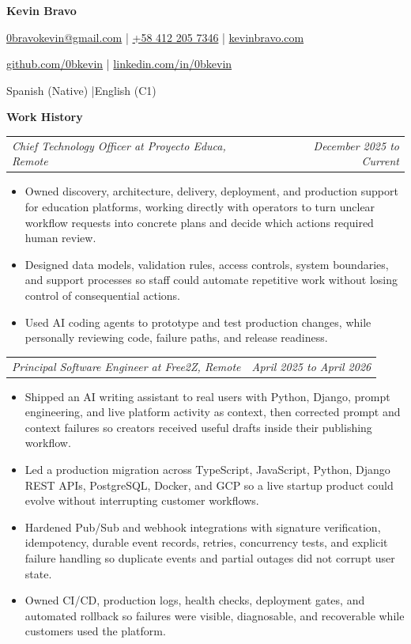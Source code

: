 \documentclass[10pt,letterpaper]{article}
\makeatletter
\newcommand{\bodyfont}{\fontsize{10.5}{15.75}\selectfont}
\newcommand{\contactfont}{\fontsize{12}{15}\selectfont}
\newcommand{\sectiontitle}[1]{%
  \vspace{4pt}
  {\bodyfont\textbf{#1}}\par
  \nopagebreak[4]
  \vspace{2pt}
}
\newcommand{\roleline}[2]{%
  \begin{tabularx}{\textwidth}{@{}Xr@{}}
    \bodyfont\textit{#1} & \bodyfont\textit{#2}
  \end{tabularx}
  \nopagebreak[4]
  \vspace{1pt}
}
\makeatother
\begin{document}
\bodyfont
\raggedright

\begin{center}
  {\fontsize{14}{17}\selectfont\textbf{Kevin Bravo}}\par
  \vspace{3pt}
  {\contactfont
    \href{mailto:0bravokevin@gmail.com}{0bravokevin@gmail.com}
    \enspace|\enspace
    \href{tel:+584122057346}{+58 412 205 7346}
    \enspace|\enspace
    \href{https://kevinbravo.com}{kevinbravo.com}
  }\par
  {\contactfont
    \href{https://github.com/0bkevin}{github.com/0bkevin}
    \enspace|\enspace
    \href{https://www.linkedin.com/in/0bkevin/}{linkedin.com/in/0bkevin}
  }\par
  {\contactfont Spanish (Native) \enspace|\enspace English (C1)}
\end{center}

\sectiontitle{Work History}

\roleline{Chief Technology Officer at Proyecto Educa, Remote}{December 2025 to Current}
\begin{itemize}
  \item Owned discovery, architecture, delivery, deployment, and production support for education platforms, working directly with operators to turn unclear workflow requests into concrete plans and decide which actions required human review.
  \item Designed data models, validation rules, access controls, system boundaries, and support processes so staff could automate repetitive work without losing control of consequential actions.
  \item Used AI coding agents to prototype and test production changes, while personally reviewing code, failure paths, and release readiness.
\end{itemize}

\vspace{3pt}
\roleline{Principal Software Engineer at Free2Z, Remote}{April 2025 to April 2026}
\begin{itemize}
  \item Shipped an AI writing assistant to real users with Python, Django, prompt engineering, and live platform activity as context, then corrected prompt and context failures so creators received useful drafts inside their publishing workflow.
  \item Led a production migration across TypeScript, JavaScript, Python, Django REST APIs, PostgreSQL, Docker, and GCP so a live startup product could evolve without interrupting customer workflows.
  \item Hardened Pub/Sub and webhook integrations with signature verification, idempotency, durable event records, retries, concurrency tests, and explicit failure handling so duplicate events and partial outages did not corrupt user state.
  \item Owned CI/CD, production logs, health checks, deployment gates, and automated rollback so failures were visible, diagnosable, and recoverable while customers used the platform.
\end{itemize}
\end{document}
